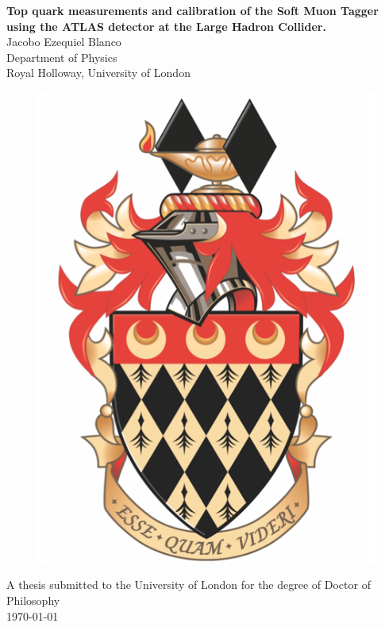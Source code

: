 \begin{titlepage}
\begin{center}
{\LARGE \textbf{Top quark measurements and calibration of the Soft Muon Tagger using the ATLAS detector at the Large Hadron Collider.\\}}
\vspace{1cm}
{\Large Jacobo Ezequiel Blanco\\}
\vspace{1cm}
{\large Department of Physics\\}
{\large Royal Holloway, University of London\\}

\begin{figure}[ht]
  \centering
  \includegraphics[width=0.3\linewidth]{./res/RHULCrest.png}
\end{figure}

{\Large A thesis submitted to the University of London for the degree of Doctor of Philosophy\\}
\vspace{1cm}
{\today\\}
\end{center}
\end{titlepage}
